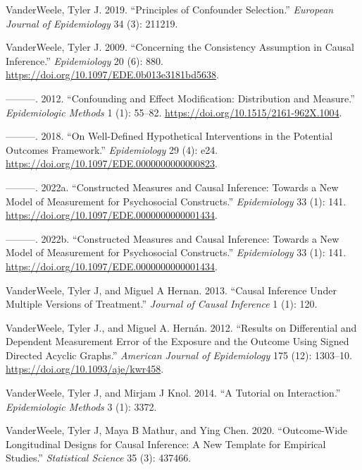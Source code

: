 \documentclass[
  singlecolumn]{report}
\newlength{\cslhangindent}
\newlength{\cslentryspacingunit} %
\newenvironment{CSLReferences}[2] %
 {%
  \setlength{\parindent}{0pt}
  \ifodd #1
  \let\oldpar\par
  \def\par{\hangindent=\cslhangindent\oldpar}
  \fi
  \setlength{\parskip}{#2\cslentryspacingunit}
 }%
 {}
\begin{document}
\begin{CSLReferences}{1}{0}
\leavevmode{}%
VanderWeele, Tyler J. 2019. {``Principles of Confounder Selection.''}
\emph{European Journal of Epidemiology} 34 (3): 211219.

\leavevmode{}%
VanderWeele, Tyler J. 2009. {``Concerning the Consistency Assumption in
Causal Inference.''} \emph{Epidemiology} 20 (6): 880.
\url{https://doi.org/10.1097/EDE.0b013e3181bd5638}.

\leavevmode{}%
---------. 2012. {``Confounding and Effect Modification: Distribution
and Measure.''} \emph{Epidemiologic Methods} 1 (1): 55--82.
\url{https://doi.org/10.1515/2161-962X.1004}.

\leavevmode{}%
---------. 2018. {``On Well-Defined Hypothetical Interventions in the
Potential Outcomes Framework.''} \emph{Epidemiology} 29 (4): e24.
\url{https://doi.org/10.1097/EDE.0000000000000823}.

\leavevmode{}%
---------. 2022a. {``Constructed Measures and Causal Inference: Towards
a New Model of Measurement for Psychosocial Constructs.''}
\emph{Epidemiology} 33 (1): 141.
\url{https://doi.org/10.1097/EDE.0000000000001434}.

\leavevmode{}%
---------. 2022b. {``Constructed Measures and Causal Inference: Towards
a New Model of Measurement for Psychosocial Constructs.''}
\emph{Epidemiology} 33 (1): 141.
\url{https://doi.org/10.1097/EDE.0000000000001434}.

\leavevmode{}%
VanderWeele, Tyler J, and Miguel A Hernan. 2013. {``Causal Inference
Under Multiple Versions of Treatment.''} \emph{Journal of Causal
Inference} 1 (1): 120.

\leavevmode{}%
VanderWeele, Tyler J., and Miguel A. Hernán. 2012. {``Results on
Differential and Dependent Measurement Error of the Exposure and the
Outcome Using Signed Directed Acyclic Graphs.''} \emph{American Journal
of Epidemiology} 175 (12): 1303--10.
\url{https://doi.org/10.1093/aje/kwr458}.

\leavevmode{}%
VanderWeele, Tyler J, and Mirjam J Knol. 2014. {``A Tutorial on
Interaction.''} \emph{Epidemiologic Methods} 3 (1): 3372.

\leavevmode{}%
VanderWeele, Tyler J, Maya B Mathur, and Ying Chen. 2020.
{``Outcome-Wide Longitudinal Designs for Causal Inference: A New
Template for Empirical Studies.''} \emph{Statistical Science} 35 (3):
437466.


\end{CSLReferences}
\end{document}
